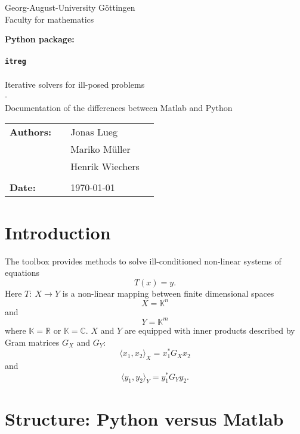 \documentclass[12pt]{scrartcl}
\begin{document}
\thispagestyle{empty}
\begin{center}
\Large{Georg-August-University Göttingen}\\
\Large{Faculty for mathematics}
\end{center}
\vspace*{3cm}
\begin{center}
\textbf{Python package:}\\
~\\
\textbf{\texttt{\Huge{itreg}}}\\
~\\
Iterative solvers for ill-posed problems\\
-\\
Documentation of the differences between Matlab and Python\\
\end{center}
\vspace*{8cm}
\begin{flushleft}
\begin{tabular}{llll}
\textbf{Authors:} & & Jonas Lueg&\\
& & Mariko Müller & \\
& & Henrik Wiechers & \\
& & \\
\textbf{Date:} & & \today &\\
\end{tabular}
\end{flushleft}

\newpage
\thispagestyle{empty}
\tableofcontents

\newpage
{}
\section{Introduction}
The toolbox provides methods to solve ill-conditioned non-linear systems of equations
$$T(x) = y.$$
Here  $T:~X \rightarrow Y$ is a non-linear mapping between finite dimensional spaces 
$$X = \mathbb{K}^n$$
and
$$Y = \mathbb{K}^m$$
where  $\mathbb{K}=\mathbb{R}$ or  $\mathbb{K}=\mathbb{C}$. $X$ and  $Y$ are equipped with inner products described by Gram matrices  $G_X$ and  $G_Y$:
$$\langle x_1,x_2 \rangle_X = x_1^\ast G_X x_2$$
and
$$\langle y_1,y_2 \rangle_Y = y_1^\ast G_Y y_2.$$
\section{Structure: Python versus Matlab}
\end{document}
